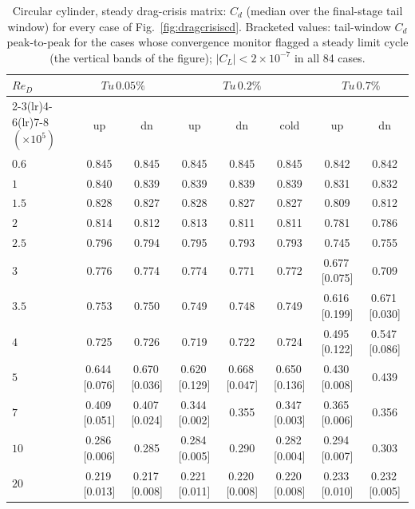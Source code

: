 \begin{table}[tp]
  \centering\small
  \caption{Circular cylinder, steady drag-crisis matrix: $C_d$ (median over the final-stage tail window) for every case of Fig.~\ref{fig:dragcrisiscd}. Bracketed values: tail-window $C_d$ peak-to-peak for the cases whose convergence monitor flagged a steady limit cycle (the vertical bands of the figure); $|C_L|\!<\!2\times10^{-7}$ in all 84 cases.}
  \label{tab:data_dragcrisis}
  \begin{tabular}{l cc ccc cc}
    \toprule
    $Re_D$ & \multicolumn{2}{c}{$Tu\,0.05\%$} & \multicolumn{3}{c}{$Tu\,0.2\%$} & \multicolumn{2}{c}{$Tu\,0.7\%$} \\ \cmidrule(lr){2-3}\cmidrule(lr){4-6}\cmidrule(lr){7-8} $(\times10^5)$ & up & dn & up & dn & cold & up & dn \\
    \midrule
    $0.6$ & 0.845 & 0.845 & 0.845 & 0.845 & 0.845 & 0.842 & 0.842 \\
    $1$ & 0.840 & 0.839 & 0.839 & 0.839 & 0.839 & 0.831 & 0.832 \\
    $1.5$ & 0.828 & 0.827 & 0.828 & 0.827 & 0.827 & 0.809 & 0.812 \\
    $2$ & 0.814 & 0.812 & 0.813 & 0.811 & 0.811 & 0.781 & 0.786 \\
    $2.5$ & 0.796 & 0.794 & 0.795 & 0.793 & 0.793 & 0.745 & 0.755 \\
    $3$ & 0.776 & 0.774 & 0.774 & 0.771 & 0.772 & 0.677\,[0.075] & 0.709 \\
    $3.5$ & 0.753 & 0.750 & 0.749 & 0.748 & 0.749 & 0.616\,[0.199] & 0.671\,[0.030] \\
    $4$ & 0.725 & 0.726 & 0.719 & 0.722 & 0.724 & 0.495\,[0.122] & 0.547\,[0.086] \\
    $5$ & 0.644\,[0.076] & 0.670\,[0.036] & 0.620\,[0.129] & 0.668\,[0.047] & 0.650\,[0.136] & 0.430\,[0.008] & 0.439 \\
    $7$ & 0.409\,[0.051] & 0.407\,[0.024] & 0.344\,[0.002] & 0.355 & 0.347\,[0.003] & 0.365\,[0.006] & 0.356 \\
    $10$ & 0.286\,[0.006] & 0.285 & 0.284\,[0.005] & 0.290 & 0.282\,[0.004] & 0.294\,[0.007] & 0.303 \\
    $20$ & 0.219\,[0.013] & 0.217\,[0.008] & 0.221\,[0.011] & 0.220\,[0.008] & 0.220\,[0.008] & 0.233\,[0.010] & 0.232\,[0.005] \\
    \bottomrule
  \end{tabular}
\end{table}
